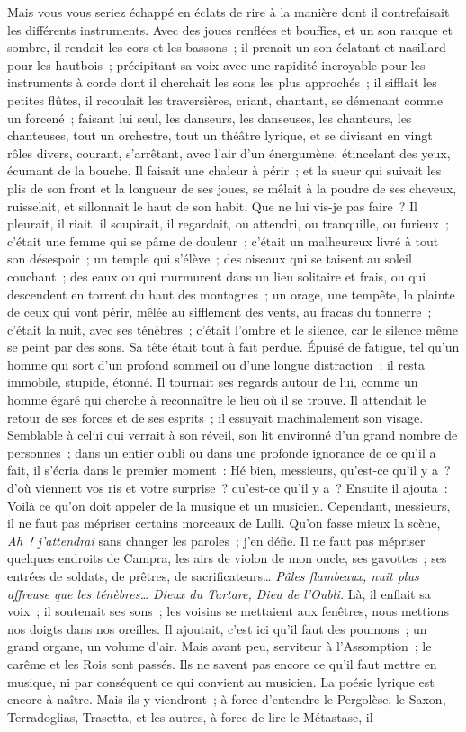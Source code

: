 \documentclass[french,twoside]{book} %
\begin{document}
Mais vous vous seriez échappé en éclats de rire à la manière dont il contrefaisait les différents instruments. Avec des joues renflées et bouffies, et un son rauque et sombre, il rendait les cors et les bassons ; il prenait un son éclatant et nasillard pour les hautbois ; précipitant sa voix avec une rapidité incroyable pour les instruments à corde dont il cherchait les sons les plus approchés ; il sifflait les petites flûtes, il recoulait les traversières, criant, chantant, se démenant comme un forcené ; faisant lui seul, les danseurs, les danseuses, les chanteurs, les chanteuses, tout un orchestre, tout un théâtre lyrique, et se divisant en vingt rôles divers, courant, s’arrêtant, avec l’air d’un énergumène, étincelant des yeux, écumant de la bouche. Il faisait une chaleur à périr ; et la sueur qui suivait les plis de son front et la longueur de ses joues, se mêlait à la poudre de ses cheveux, ruisselait, et sillonnait le haut de son habit. Que ne lui vis-je pas faire ? Il pleurait, il riait, il soupirait, il regardait, ou attendri, ou tranquille, ou furieux ; c’était une femme qui se pâme de douleur ; c’était un malheureux livré à tout son désespoir ; un temple qui s’élève ; des oiseaux qui se taisent au soleil couchant ; des eaux ou qui murmurent dans un lieu solitaire et frais, ou qui descendent en torrent du haut des montagnes ; un orage, une tempête, la plainte de ceux qui vont périr, mêlée au sifflement des vents, au fracas du tonnerre ; c’était la nuit, avec ses ténèbres ; c’était l’ombre et le silence, car le silence même se peint par des sons. Sa tête était tout à fait perdue. Épuisé de fatigue, tel qu’un homme qui sort d’un profond sommeil ou d’une longue distraction ; il resta immobile, stupide, étonné. Il tournait ses regards autour de lui, comme un homme égaré qui cherche à reconnaître le lieu où il se trouve. Il attendait le retour de ses forces et de ses esprits ; il essuyait machinalement son visage. Semblable à celui qui verrait à son réveil, son lit environné d’un grand nombre de personnes ; dans un entier oubli ou dans une profonde ignorance de ce qu’il a fait, il s’écria dans le premier moment : Hé bien, messieurs, qu’est-ce qu’il y a ? d’où viennent vos ris et votre surprise ? qu’est-ce qu’il y a ? Ensuite il ajouta : Voilà ce qu’on doit appeler de la musique et un musicien. Cependant, messieurs, il ne faut pas mépriser certains morceaux de Lulli. Qu’on fasse mieux la scène, \emph{Ah ! j’attendrai} sans changer les paroles ; j’en défie. Il ne faut pas mépriser quelques endroits de Campra, les airs de violon de mon oncle, ses gavottes ; ses entrées de soldats, de prêtres, de sacrificateurs… \emph{Pâles flambeaux, nuit plus affreuse que les ténèbres… Dieux du Tartare, Dieu de l’Oubli.} Là, il enflait sa voix ; il soutenait ses sons ; les voisins se mettaient aux fenêtres, nous mettions nos doigts dans nos oreilles. Il ajoutait, c’est ici qu’il faut des poumons ; un grand organe, un volume d’air. Mais avant peu, serviteur à l’Assomption ; le carême et les Rois sont passés. Ils ne savent pas encore ce qu’il faut mettre en musique, ni par conséquent ce qui convient au musicien. La poésie lyrique est encore à naître. Mais ils y viendront ; à force d’entendre le Pergolèse, le Saxon, Terradoglias, Trasetta, et les autres, à force de lire le Métastase, il 
\end{document}
